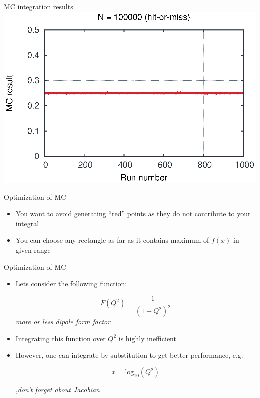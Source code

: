 \begin{emptyslide}{MC integration results}
{    \includegraphics[width=\columnwidth]{figures/int100000.eps}
  }

\vfill\null
\end{emptyslide}


\begin{slide}{Optimization of MC}
\null\vfill

  \twocolumn
  {
    \scalebox{.75}{}
  }
  {
    \scalebox{.75}{}
  }

  \begin{itemize}
   \item You want to avoid generating ``red'' points as they do not contribute to your integral
   \item You can choose any rectangle as far as it contains maximum of $f(x)$ in given range
  \end{itemize}

\vfill\null
\end{slide}

\begin{slide}[toc=]{Optimization of MC}
\null\vfill

  \twocolumn
  {
    \begin{itemize}
      \item Lets consider the following function:
  
      $$F(Q^2) = \frac{1}{(1 + Q^2)^2}$$
      {\it\color{pdcolor3} more or less dipole form factor}
      
      \item Integrating this function over $Q^2$ is highly inefficient
      
      \item However, one can integrate by substitution to get better performance, e.g.
      
      $$x = \mbox{log}_{10}(Q^2)$$
      
    \sep{\it\color{pdcolor6}don't forget about Jacobian}

    \end{itemize}

  }
  {
    
    \vspace{-10pt}
        
  }
    
\vfill\null
\end{slide}

